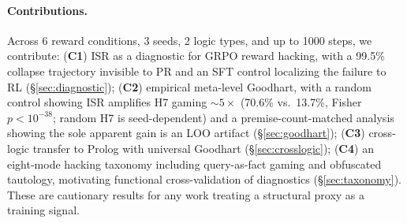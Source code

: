 \paragraph{Contributions.}
Across 6 reward conditions, 3 seeds, 2 logic types, and up to 1000 steps, we contribute: (\textbf{C1}) ISR as a diagnostic for GRPO reward hacking, with a 99.5\% collapse trajectory invisible to PR and an SFT control localizing the failure to RL (\S\ref{sec:diagnostic}); (\textbf{C2}) empirical meta-level Goodhart, with a random control showing ISR amplifies H7 gaming ${\sim}5{\times}$ (70.6\% vs.\ 13.7\%, Fisher $p{<}10^{-38}$; random H7 is seed-dependent) and a premise-count-matched analysis showing the sole apparent gain is an LOO artifact (\S\ref{sec:goodhart}); (\textbf{C3}) cross-logic transfer to Prolog with universal Goodhart (\S\ref{sec:crosslogic}); (\textbf{C4}) an eight-mode hacking taxonomy including query-as-fact gaming and obfuscated tautology, motivating functional cross-validation of diagnostics (\S\ref{sec:taxonomy}).
These are cautionary results for any work treating a structural proxy as a training signal.
